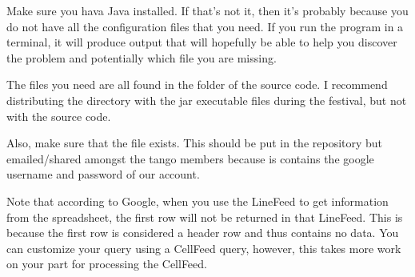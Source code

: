 \documentclass[12pt,final]{article}
\begin{document}

Make sure you hava Java installed. If that's not it, then it's probably
because you do not have all the configuration files that you need. If you run
the program in a terminal, it will produce output that will hopefully be able
to help you discover the problem and potentially which file you are missing.

The files you need are all found in the  folder of the source code.
I recommend distributing the  directory with the jar executable
files during the festival, but not with the source code. 

Also, make sure that the  file exists. This should
 be put in the repository but emailed/shared amongst the tango
members because is contains the google username and password of our account.


Note that according to Google, when you use the LineFeed to get information
from the spreadsheet, the first row will not be returned in that LineFeed.
This is because the first row is considered a header row and thus
contains no data. You can customize your query using a CellFeed query,
however, this takes more work on your part for processing the CellFeed.
\end{document}
